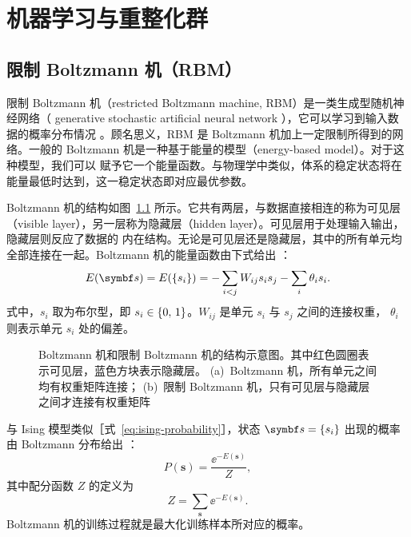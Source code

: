\chapter{机器学习与重整化群}

\section{限制 Boltzmann 机（RBM）}

限制 Boltzmann 机（restricted Boltzmann machine, RBM）是一类生成型随机神经网络（ generative
stochastic artificial neural network ），它可以学习到输入数据的概率分布情况
\cite{hinton2006reducing}。顾名思义，RBM 是 Boltzmann 机加上一定限制所得到的网络。一般的 Boltzmann
机是一种基于能量的模型（energy-based model）\cite{zhouzhihua,rbmonline}。对于这种模型，我们可以
赋予它一个能量函数。与物理学中类似，体系的稳定状态将在能量最低时达到，这一稳定状态即对应最优参数。

Boltzmann 机的结构如图~\ref{fig:boltzmann-machine} 所示。它共有两层，与数据直接相连的称为可见层
（visible layer），另一层称为隐藏层（hidden layer）。可见层用于处理输入输出，隐藏层则反应了数据的
内在结构。无论是可见层还是隐藏层，其中的所有单元均全部连接在一起。Boltzmann 机的能量函数由下式给出
\cite{zhouzhihua}：
\begin{equation}
  E(\bm{s}) = E(\q{s_i}) = - \sum_{i<j} W_{ij} s_i s_j - \sum_i \theta_i s_i.
\end{equation}
式中，$s_i$ 取为布尔型，即 $s_i\in{\{0,\,1\}}$。$W_{ij}$ 是单元 $s_i$ 与 $s_j$ 之间的连接权重，
$\theta_i$ 则表示单元 $s_i$ 处的偏差。

\begin{figure}[htb]
  \centering
  \begin{subfigure}[b]{0.45\textwidth}
    \centering
    \caption{}
    \label{fig:boltzmann-machine}
  \end{subfigure}
  \begin{subfigure}[b]{0.45\textwidth}
    \centering
    \vspace{0.4cm}
    \caption{}
    \label{fig:rbm}
  \end{subfigure}
  \caption{Boltzmann 机和限制 Boltzmann 机的结构示意图。其中红色圆圈表示可见层，蓝色方块表示隐藏层。
    (a)~Boltzmann 机，所有单元之间均有权重矩阵连接；
    (b)~限制 Boltzmann 机，只有可见层与隐藏层之间才连接有权重矩阵}
\end{figure}

与 Ising 模型类似［式~\eqref{eq:ising-probability}］，状态 $\bm{s}=\q{s_i}$ 出现的概率由 Boltzmann
分布给出 \cite{rbmonline}：
\begin{equation}
  \label{eq:boltzmann-machine-probability}
  P(\bm{s}) = \frac{\ee^{-E(\bm{s})}}{Z},
\end{equation}
其中配分函数 $Z$ 的定义为
\begin{equation}
  Z = \sum_{\bm{s}} \ee^{-E(\bm{s})}.
\end{equation}
Boltzmann 机的训练过程就是最大化训练样本所对应的概率。

